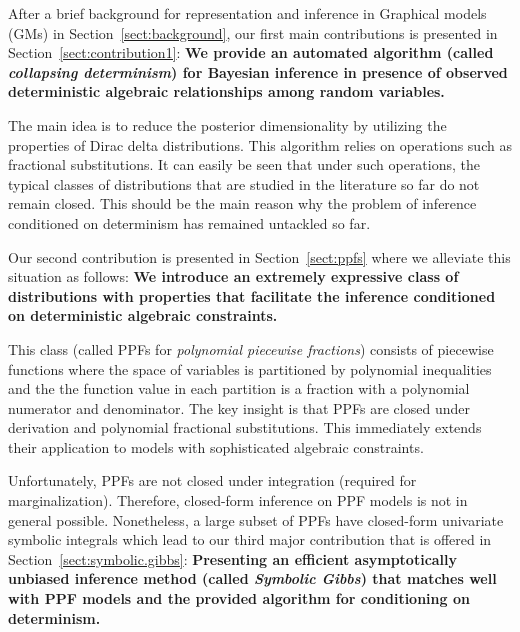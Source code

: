\documentclass{article}
\begin{document}
After a brief background for representation and inference in Graphical models (GMs) in Section~\ref{sect:background}, 
our first main contributions is presented in Section~\ref{sect:contribution1}:
{
\bf
We provide an automated algorithm (called \emph{collapsing determinism}) for Bayesian inference in 
presence of observed deterministic algebraic relationships among random variables.
}

The main idea is to reduce the posterior dimensionality by utilizing 
the properties of Dirac delta distributions. 
This algorithm relies on operations such as fractional substitutions. 
It can easily be seen that under such operations, the typical classes of distributions that are studied in the literature so far do not remain closed.
This should be the main reason why the problem of inference conditioned on determinism has remained {\color{green}untackled} so far. 

Our second contribution is presented in Section~\ref{sect:ppfs} where we {\color{green}alleviate} this situation as follows:
{\bf
We introduce an extremely expressive class of distributions with properties that facilitate the inference conditioned on deterministic algebraic constraints.
}

This class (called PPFs for \emph{polynomial piecewise fractions}) {\color{green}consists of} piecewise functions where the space of variables is partitioned by polynomial inequalities and the the function value in each partition is a fraction with a polynomial numerator and denominator.  
The key insight is that PPFs are closed under derivation and polynomial fractional substitutions. This immediately extends their application to models with sophisticated algebraic constraints.

Unfortunately, PPFs are not closed under integration 
(required for marginalization).
Therefore, closed-form inference on PPF models is not in general possible. 
Nonetheless, a large subset of PPFs have closed-form univariate symbolic integrals which lead to our third major contribution that is offered in Section~\ref{sect:symbolic.gibbs}:
{
\bf
Presenting an efficient asymptotically unbiased inference method (called \emph{Symbolic Gibbs}) that matches well with PPF models and the provided algorithm for conditioning on determinism.
}
\end{document}
